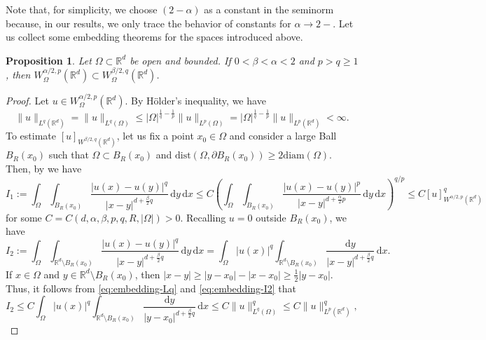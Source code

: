 \documentclass[reqno]{amsart}
\theoremstyle{plain}
\newtheorem{proposition}[theorem]{Proposition}
\theoremstyle{definition}
\numberwithin{equation}{section}
\newcommand{\Rd}{\mathbb{R}^d}
\newcommand{\dx} {\, \mathrm{d}x}
\newcommand{\dy} {\, \mathrm{d}y}
\begin{document}
Note that, for simplicity, we choose $(2-\alpha)$ as a constant in the seminorm because, in our results, we only trace the behavior of constants for $\alpha \to 2-$. Let us collect some embedding theorems for the spaces introduced above. 

\begin{proposition} \label{prop:cont-embedding}
Let $\Omega \subset \Rd$ be open and bounded. If $0<\beta<\alpha<2$ and $p>q\geq1$, then $W^{\alpha/2,p}_{\Omega}(\Rd) \subset W^{\beta/2,q}_{\Omega}(\Rd)$.
\end{proposition}

\begin{proof}
Let $u \in W^{\alpha/2,p}_{\Omega}(\Rd)$. By H\"older's inequality, we have
\begin{equation} \label{eq:embedding-Lq}
\|u\|_{L^{q}(\Rd)} = \|u\|_{L^{q}(\Omega)} \leq |\Omega|^{\frac{1}{q}-\frac{1}{p}} \|u\|_{L^{p}(\Omega)} = |\Omega|^{\frac{1}{q}-\frac{1}{p}} \|u\|_{L^{p}(\Rd)} < \infty.
\end{equation}
To estimate $[u]_{W^{\beta/2,q}(\Rd)}$, let us fix a point $x_{0} \in \Omega$ and consider a large Ball $B_{R}(x_{0})$ such that $\Omega \subset B_{R}(x_{0})$ and $\mathrm{dist}(\Omega, \partial B_{R}(x_{0})) \geq 2\mathrm{diam}(\Omega)$. Then, by \cite[Lemma 4.6]{Coz17} we have
\begin{equation} \label{eq:embedding-I1}
I_{1} := \int_{\Omega} \int_{B_{R}(x_{0})} \frac{|u(x)-u(y)|^{q}}{|x-y|^{d+\frac{\beta}{2}q}} \dy \dx \leq C \left( \int_{\Omega} \int_{B_{R}(x_{0})} \frac{|u(x)-u(y)|^{p}}{|x-y|^{d+\frac{\alpha}{2}p}} \dy \dx \right)^{q/p} \leq C [u]_{W^{\alpha/2, p}(\Rd)}^{q}
\end{equation}
for some $C = C(d, \alpha, \beta, p, q, R, |\Omega|)>0$. Recalling $u=0$ outside $B_{R}(x_{0})$, we have
\begin{equation} \label{eq:embedding-I2}
I_{2} := \int_{\Omega} \int_{\Rd \setminus B_{R}(x_{0})} \frac{|u(x)-u(y)|^{q}}{|x-y|^{d+\frac{\beta}{2}q}} \dy \dx = \int_{\Omega} |u(x)|^{q} \int_{\Rd \setminus B_{R}(x_{0})} \frac{\mathrm{d}y}{|x-y|^{d+\frac{\beta}{2}q}} \dx.
\end{equation}
If $x \in \Omega$ and $y \in \Rd \setminus B_{R}(x_{0})$, then $|x-y| \geq |y-x_{0}| - |x-x_{0}| \geq \frac{1}{2} |y-x_{0}|$. Thus, it follows from \eqref{eq:embedding-Lq} and \eqref{eq:embedding-I2} that
\begin{equation} \label{eq:embedding-I22}
I_{2} \leq C \int_{\Omega} |u(x)|^{q} \int_{\Rd \setminus B_{R}(x_{0})} \frac{\mathrm{d}y}{|y-x_{0}|^{d+\frac{\beta}{2}q}} \dx \leq C \|u\|_{L^{q}(\Omega)}^{q} \leq C \|u\|_{L^{p}(\Rd)}^{q},

\end{equation}
\end{proof}
\end{document}

